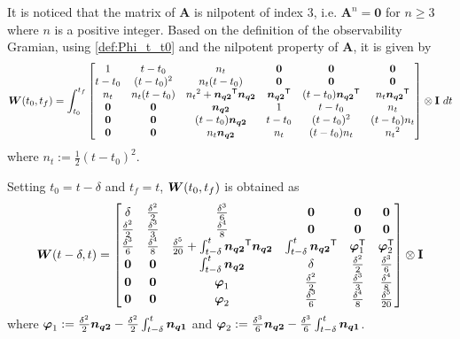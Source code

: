 \documentclass[journal,onecolumn]{IEEEtran}
\begin{document}
It is noticed that the matrix of ${\mathbf A}$ is nilpotent of index 3, i.e. ${\mathbf A}^n={\mathbf 0}$ for $n\geq3$ where $n$ is a positive integer.
Based on the definition of the observability Gramian, using \eqref{def:Phi_t_t0} and the nilpotent property of ${\mathbf A}$, it is given by
%
	\begin{align}
		\boldsymbol{W}(t_0,t_f)=\int_{t_0}^{t_f}
		\begin{bmatrix}
			1  & t-t_0 & n_t  & {\bf 0} & {\bf 0} & {\bf 0} \\
			t-t_0 & (t-t_0)^2 & n_t(t-t_0) & {\bf 0} & {\bf 0} & {\bf 0} \\
			n_t & n_t(t-t_0) & {n_t}^2+\boldsymbol{n_{q2}}^\mathsf{T}\boldsymbol{n_{q2}} & \boldsymbol{n_{q2}}^\mathsf{T} & (t-t_0)\boldsymbol{n_{q2}}^\mathsf{T} & n_t\boldsymbol{n_{q2}}^\mathsf{T}\\
			{\bf 0} & {\bf 0} & \boldsymbol{n_{q2}}  & 1  & t-t_0 & n_t\\
			{\bf 0} & {\bf 0} & (t-t_0)\boldsymbol{n_{q2}} & t-t_0 & (t-t_0)^2 & (t-t_0)n_t\\
			{\bf 0} & {\bf 0} & n_t\boldsymbol{n_{q2}} & n_t & (t-t_0)n_t & {n_t}^2
		\end{bmatrix}\otimes {\bf I}~dt
		\label{eq:W_t0_tf}
	\end{align}
%
where $n_t:=\frac{1}{2}(t-{t_0})^2$.

Setting $t_0=t-\delta$ and $t_f=t$, $\boldsymbol{W}(t_0,t_f)$ is obtained as
%
	\begin{align}
		\boldsymbol{W}(t-\delta,t)=
		\begin{bmatrix}
			\delta  & \frac{\delta^2}{2} & \frac{\delta^3}{6}  & {\bf 0} & {\bf 0} & {\bf 0} \\
			\frac{\delta^2}{2} & \frac{\delta^3}{3} & \frac{\delta^4}{8} & {\bf 0} & {\bf 0} & {\bf 0} \\
			\frac{\delta^3}{6} & \frac{\delta^4}{8} & \frac{\delta^5}{20}+\int_{t-\delta}^{t}\boldsymbol{n_{q2}}^\mathsf{T}\boldsymbol{n_{q2}} & \int_{t-\delta}^{t}\boldsymbol{n_{q2}}^\mathsf{T} & \boldsymbol{\varphi}_1^\mathsf{T} & \boldsymbol{\varphi}_2^\mathsf{T}\\
			{\bf 0} & {\bf 0} & \int_{t-\delta}^{t}\boldsymbol{n_{q2}}  & \delta  & \frac{\delta^2}{2} & \frac{\delta^3}{6}\\
			{\bf 0} & {\bf 0} & \boldsymbol{\varphi}_1 & \frac{\delta^2}{2} & \frac{\delta^3}{3} & \frac{\delta^4}{8}\\
			{\bf 0} & {\bf 0} & \boldsymbol{\varphi}_2 & \frac{\delta^3}{6} & \frac{\delta^4}{8} & \frac{\delta^5}{20}
		\end{bmatrix}\otimes {\bf I}
		\label{eq:W_t_delta}
	\end{align}
%
where $\boldsymbol{\varphi}_1:=\frac{\delta^2}{2}\boldsymbol{n_{q2}} - \frac{\delta^2}{2} \int_{t-\delta}^{t}\boldsymbol{n_{q1}}$ and $\boldsymbol{\varphi}_2:=\frac{\delta^3}{6}\boldsymbol{n_{q2}} - \frac{\delta^3}{6} \int_{t-\delta}^{t}\boldsymbol{n_{q1}}$.
\end{document}
